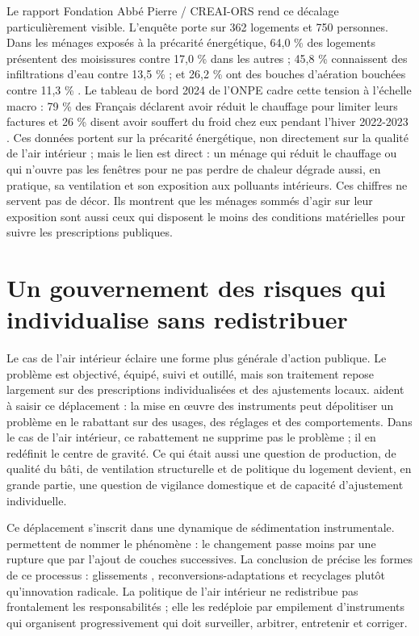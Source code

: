 \documentclass[a4paper,12pt,twoside]{book}
\begin{document}
Le rapport Fondation Abbé Pierre / CREAI-ORS rend ce décalage particulièrement visible. L'enquête porte sur 362 logements et 750 personnes. Dans les ménages exposés à la précarité énergétique, 64,0 \% des logements présentent des moisissures contre 17,0 \% dans les autres ; 45,8 \% connaissent des infiltrations d'eau contre 13,5 \% ; et 26,2 \% ont des bouches d'aération bouchées contre 11,3 \% \parencite{FondationAbbePierre2013PrecariteSante}. Le tableau de bord 2024 de l'ONPE cadre cette tension à l'échelle macro : 79 \% des Français déclarent avoir réduit le chauffage pour limiter leurs factures et 26 \% disent avoir souffert du froid chez eux pendant l'hiver 2022-2023 \parencite{ONPE2024TableauBord}. Ces données portent sur la précarité énergétique, non directement sur la qualité de l'air intérieur ; mais le lien est direct : un ménage qui réduit le chauffage ou qui n'ouvre pas les fenêtres pour ne pas perdre de chaleur dégrade aussi, en pratique, sa ventilation et son exposition aux polluants intérieurs. Ces chiffres ne servent pas de décor. Ils montrent que les ménages sommés d'agir sur leur exposition sont aussi ceux qui disposent le moins des conditions matérielles pour suivre les prescriptions publiques.

\section{Un gouvernement des risques qui individualise sans redistribuer}

Le cas de l'air intérieur éclaire une forme plus générale d'action publique. Le problème est objectivé, équipé, suivi et outillé, mais son traitement repose largement sur des prescriptions individualisées et des ajustements locaux. \textcite{MontouroyBiabianyMassardier2022Declimatisation} aident à saisir ce déplacement : la mise en œuvre des instruments peut dépolitiser un problème en le rabattant sur des usages, des réglages et des comportements. Dans le cas de l'air intérieur, ce rabattement ne supprime pas le problème ; il en redéfinit le centre de gravité. Ce qui était aussi une question de production, de qualité du bâti, de ventilation structurelle et de politique du logement devient, en grande partie, une question de vigilance domestique et de capacité d'ajustement individuelle.

Ce déplacement s'inscrit dans une dynamique de sédimentation instrumentale. \textcite{palierChapitre7Instruments2005} permettent de nommer le phénomène : le changement passe moins par une rupture que par l'ajout de couches successives. La conclusion de \textcite{lascoumesConclusionLinnovationInstrumentale2005} précise les formes de ce processus : \og glissements \fg, \og reconversions-adaptations \fg et \og recyclages \fg plutôt qu'innovation radicale. La politique de l'air intérieur ne redistribue pas frontalement les responsabilités ; elle les redéploie par empilement d'instruments qui organisent progressivement qui doit surveiller, arbitrer, entretenir et corriger.
\end{document}
